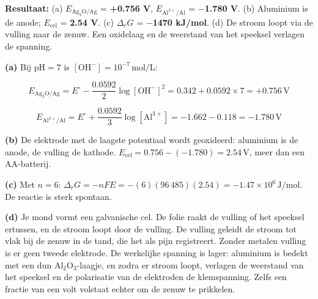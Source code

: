 \begin{oplossing}
\textbf{Resultaat:} (a) \(E_{\mathrm{Ag_2O/Ag}}\) = \textbf{+0.756 V}, \(E_{\mathrm{Al^{3+}/Al}}\) = \textbf{\ensuremath{-}1.780 V}. (b) Aluminium is de anode; \(E_{\text{cel}}\) = \textbf{2.54 V}. (c) \(\Delta_r G\) = \textbf{\ensuremath{-}1470 kJ/mol}. (d) De stroom loopt via de vulling naar de zenuw. Een oxidelaag en de weerstand van het speeksel verlagen de spanning.

\textbf{(a)} Bij \(\mathrm{pH} = 7\) is \([\mathrm{OH^-}] = 10^{-7}\,\mathrm{mol/L}\):

\[
E_{\mathrm{Ag_2O/Ag}} = E^\circ - \frac{0.0592}{2}\log[\mathrm{OH^-}]^2 = 0.342 + 0.0592 \times 7 = +0.756\,\mathrm{V}
\]

\[
E_{\mathrm{Al^{3+}/Al}} = E^\circ + \frac{0.0592}{3}\log[\mathrm{Al^{3+}}] = -1.662 - 0.118 = -1.780\,\mathrm{V}
\]

\textbf{(b)} De elektrode met de laagste potentiaal wordt geoxideerd: aluminium is de anode, de vulling de kathode. \(E_{\text{cel}} = 0.756 - (-1.780) = 2.54\,\mathrm{V}\), meer dan een AA-batterij.

\textbf{(c)} Met \(n = 6\): \(\Delta_r G = -nFE = -(6)(96\,485)(2.54) = -1.47\times10^{6}\,\mathrm{J/mol}\). De reactie is sterk spontaan.

\textbf{(d)} Je mond vormt een galvanische cel. De folie raakt de vulling of het speeksel ertussen, en de stroom loopt door de vulling. De vulling geleidt de stroom tot vlak bij de zenuw in de tand, die het als pijn registreert. Zonder metalen vulling is er geen tweede elektrode. De werkelijke spanning is lager: aluminium is bedekt met een dun \(\mathrm{Al_2O_3}\)-laagje, en zodra er stroom loopt, verlagen de weerstand van het speeksel en de polarisatie van de elektroden de klemspanning. Zelfs een fractie van een volt volstaat echter om de zenuw te prikkelen.
\end{oplossing}

